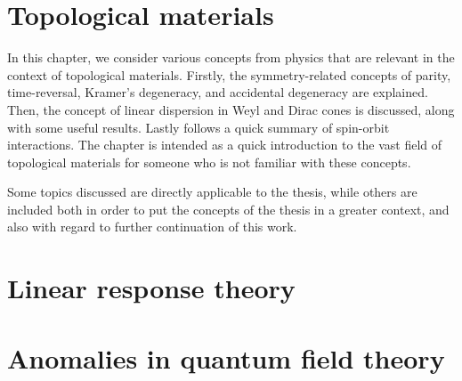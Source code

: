 \documentclass[
fontsize=11pt,
paper=B5,
BCOR=5mm,
captions=tableheading,
]{scrbook}
\begin{document}
% 
\frontmatter
{}


\tableofcontents

\mainmatter
{}


\chapter{Topological materials}
In this chapter, we consider various concepts from physics that are relevant in the context of topological materials.
Firstly, the symmetry-related concepts of parity, time-reversal, Kramer's degeneracy, and accidental degeneracy are explained.
Then, the concept of linear dispersion in Weyl and Dirac cones is discussed, along with some useful results.
Lastly follows a quick summary of spin-orbit interactions.
The chapter is intended as a quick introduction to the vast field of topological materials for someone who is not familiar with these concepts.

Some topics discussed are directly applicable to the thesis, while others are included both in order to put the concepts of the thesis in a greater context, and also with regard to further continuation of this work.








\chapter{Linear response theory}


\chapter{Anomalies in quantum field theory}


\end{document}
